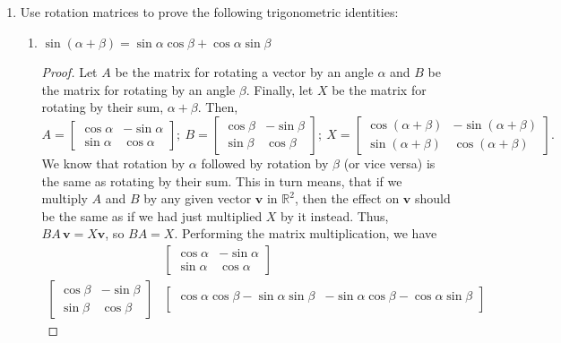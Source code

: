 \documentclass{article}
\begin{document}
\begin{enumerate}
    \item Use rotation matrices to prove the following trigonometric identities:\begin{enumerate}
        \item \(\sin(\alpha + \beta) = \sin\alpha\cos\beta + \cos\alpha\sin\beta\)\begin{proof}
            Let \(A\) be the matrix for rotating a vector by an angle \(\alpha\) and \(B\) be the matrix for rotating by an angle \(\beta\). Finally, let \(X\) be the matrix for rotating by their sum, \(\alpha + \beta\). Then,\[
                A = \begin{bmatrix}
                    \cos\alpha&-\sin\alpha \\ \sin\alpha&\cos\alpha
                \end{bmatrix};~B = \begin{bmatrix}
                    \cos\beta&-\sin\beta \\ \sin\beta&\cos\beta
                \end{bmatrix};~X =  \begin{bmatrix}
                    \cos(\alpha + \beta)&-\sin(\alpha + \beta) \\ \sin(\alpha+\beta)&\cos(\alpha + \beta)
                \end{bmatrix}.
            \] We know that rotation by \(\alpha\) followed by rotation by \(\beta\) (or vice versa) is the same as rotating by their sum. This in turn means, that if we multiply \(A\) and \(B\) by any given vector \(\mathbf{v}\) in \(\mathbb{R}^2\), then the effect on \(\mathbf{v}\)
            should be the same as if we had just multiplied \(X\) by it instead. Thus, \(BA\,\mathbf{v} = X\mathbf{v}\), so \(BA = X\). Performing the matrix multiplication, we have\begin{align*}
                &\begin{bmatrix}
                    \cos\alpha&-\sin\alpha \\ \sin\alpha&\cos\alpha
                \end{bmatrix} \\
                \begin{bmatrix}
                    \cos\beta&-\sin\beta \\ \sin\beta&\cos\beta
                \end{bmatrix} & \begin{bmatrix}
                    \cos\alpha\cos\beta - \sin\alpha\sin\beta&-\sin\alpha\cos\beta-\cos\alpha\sin\beta \\ 

\end{bmatrix}
\end{align*}
\end{proof}
\end{enumerate}
\end{enumerate}
\end{document}
